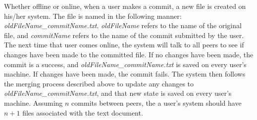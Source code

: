 \documentclass{6033dp1/6033dp1}
\begin{document}
Whether offline or online, when a user makes a commit, a new file is created on his/her system. The file is named in the following manner: \emph{oldFileName\_commitName.txt}. \emph{oldFileName} refers to the name of the original file, and \emph{commitName} refers to the name of the commit submitted by the user. The next time that user comes online, the system will talk to all peers to see if changes have been made to the committed file. If no changes have been made, the commit is a success, and \emph{oldFileName\_commitName.txt} is saved on every user's machine. If changes have been made, the commit fails. The system then follows the merging process described above to update any changes to \emph{oldFileName\_commitName.txt}, and that new state is saved on every user's machine. Assuming $n$ commits between peers, the a user's system should have $n+1$ files associated with the text document.



\end{document}
